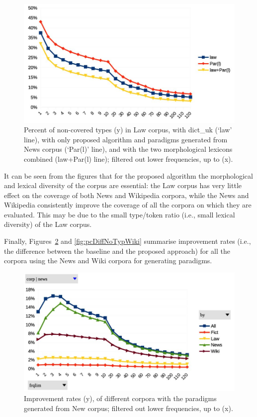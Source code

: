 \documentclass[11pt,a4paper]{article}
\begin{document}
\begin{figure}
	\includegraphics[width=\linewidth]{evaluation-coverage-lawN.jpg}
	\caption{Percent of non-covered types (y) in Law corpus, with dict\_uk (`law' line), with only proposed algorithm and paradigms generated from News corpus (`Par(l)' line), and with the two morphological lexicons combined (law+Par(l) line); filtered out lower frequencies, up to (x).}
	\label{fig:pcNoTypLawN}
\end{figure}


It can be seen from the figures that for the proposed algorithm the morphological and lexical diversity of the corpus are essential: the Law corpus has very little effect on the coverage of both News and Wikipedia corpora, while the News and Wikipedia consistently improve the coverage of all the corpora on which they are evaluated. This may be due to the small type/token ratio (i.e., small lexical diversity) of the Law corpus.

Finally, Figures~\ref{fig:pcDiffNoTypNews} and \ref{fig:pcDiffNoTypWiki} summarise improvement rates (i.e., the difference between the baseline and the proposed approach) for all the corpora using the News and Wiki corpora for generating paradigms.

\begin{figure}
	\includegraphics[width=\linewidth]{evaluation-improv-DiffNoTypNews.jpg}
	\caption{Improvement rates (y), of different corpora with the paradigms generated from New corpus; filtered out lower frequencies, up to (x).}
	\label{fig:pcDiffNoTypNews}
\end{figure}
\end{document}

